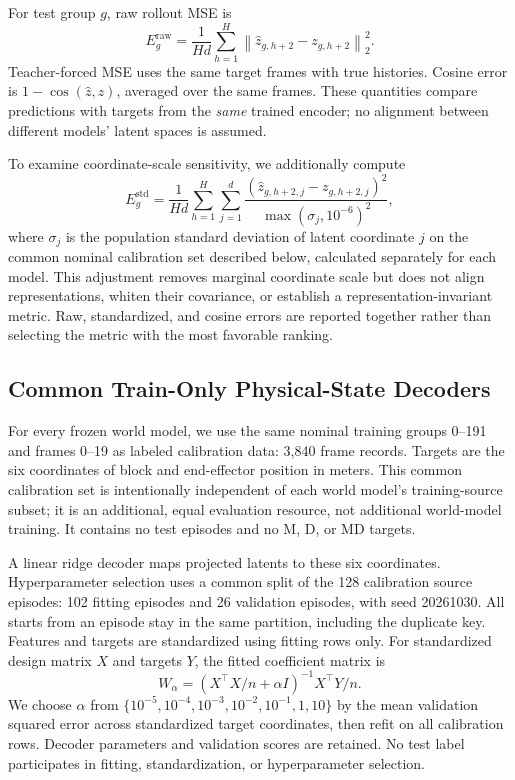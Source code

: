 For test group $g$, raw rollout MSE is
\begin{equation}
 E_g^{\mathrm{raw}}=\frac{1}{Hd}\sum_{h=1}^{H}
 \left\|\hat z_{g,h+2}-z_{g,h+2}\right\|_2^2.
\end{equation}
Teacher-forced MSE uses the same target frames with true histories. Cosine error is $1-\cos(\hat z,z)$, averaged over the same frames. These quantities compare predictions with targets from the \emph{same} trained encoder; no alignment between different models' latent spaces is assumed.

To examine coordinate-scale sensitivity, we additionally compute
\begin{equation}
 E_g^{\mathrm{std}}=\frac{1}{Hd}\sum_{h=1}^{H}\sum_{j=1}^{d}
 \frac{(\hat z_{g,h+2,j}-z_{g,h+2,j})^2}
 {\max(\sigma_j,10^{-6})^2},
\label{eq:standardized}
\end{equation}
where $\sigma_j$ is the population standard deviation of latent coordinate $j$ on the common nominal calibration set described below, calculated separately for each model. This adjustment removes marginal coordinate scale but does not align representations, whiten their covariance, or establish a representation-invariant metric. Raw, standardized, and cosine errors are reported together rather than selecting the metric with the most favorable ranking.

\subsection{Common Train-Only Physical-State Decoders}
\label{sec:decoder}
For every frozen world model, we use the same nominal training groups 0--191 and frames 0--19 as labeled calibration data: 3,840 frame records. Targets are the six coordinates of block and end-effector position in meters. This common calibration set is intentionally independent of each world model's training-source subset; it is an additional, equal evaluation resource, not additional world-model training. It contains no test episodes and no M, D, or MD targets.

A linear ridge decoder maps projected latents to these six coordinates. Hyperparameter selection uses a common split of the 128 calibration source episodes: 102 fitting episodes and 26 validation episodes, with seed 20261030. All starts from an episode stay in the same partition, including the duplicate key. Features and targets are standardized using fitting rows only. For standardized design matrix $X$ and targets $Y$, the fitted coefficient matrix is
\begin{equation}
 W_\alpha=(X^\top X/n+\alpha I)^{-1}X^\top Y/n.
\end{equation}
We choose $\alpha$ from $\{10^{-5},10^{-4},10^{-3},10^{-2},10^{-1},1,10\}$ by the mean validation squared error across standardized target coordinates, then refit on all calibration rows. Decoder parameters and validation scores are retained. No test label participates in fitting, standardization, or hyperparameter selection.

